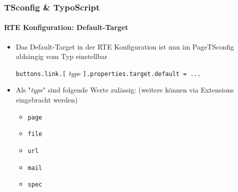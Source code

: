\begin{frame}[fragile]
	\frametitle{TSconfig \& TypoScript}
	\framesubtitle{RTE Konfiguration: Default-Target}

	\begin{itemize}
		\item Das Default-Target in der RTE Konfiguration ist nun im PageTSconfig abhängig vom Typ einstellbar\newline

			\small
				\texttt{buttons.link.[}
				\textit{type}
				\texttt{].properties.target.default = ...}
			\normalsize\newline

		\item Als "\textit{type}" sind folgende Werte zulässig:\newline
			\small
				(weitere können via Extensions eingebracht werden)
			\normalsize

			\begin{itemize}
				\item \texttt{page}
				\item \texttt{file}
				\item \texttt{url}
				\item \texttt{mail}
				\item \texttt{spec}
			\end{itemize}
	\end{itemize}

\end{frame}

